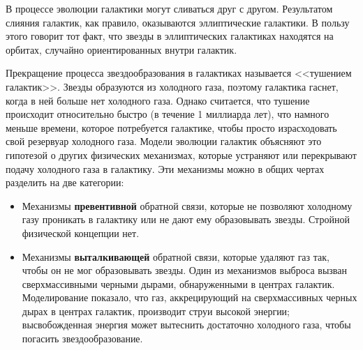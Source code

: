 В процессе эволюции галактики могут сливаться друг с другом. Результатом слияния галактик, как правило, оказываются эллиптические галактики. В пользу этого говорит тот факт, что звезды в эллиптических галактиках находятся на орбитах, случайно ориентированных внутри галактик.

Прекращение процесса звездообразования в галактиках называется <<тушением галактик>>. Звезды образуются из холодного газа, поэтому галактика гаснет, когда в ней больше нет холодного газа. Однако считается, что тушение происходит относительно быстро (в течение 1 миллиарда лет), что намного меньше времени, которое потребуется галактике, чтобы просто израсходовать свой резервуар холодного газа. Модели эволюции галактик объясняют это гипотезой о других физических механизмах, которые устраняют или перекрывают подачу холодного газа в галактику. Эти механизмы можно в общих чертах разделить на две категории:

\begin{itemize}
	\item Механизмы \textbf{превентивной} обратной связи, которые не позволяют холодному газу проникать в галактику или не дают ему образовывать звезды. Стройной физической концепции нет.
	
	\item Механизмы \textbf{выталкивающей} обратной связи, которые удаляют газ так, чтобы он не мог образовывать звезды. Один из механизмов выброса  вызван сверхмассивными черными дырами, обнаруженными в центрах галактик. Моделирование показало, что газ, аккрецирующий на сверхмассивных черных дырах в центрах галактик, производит струи высокой энергии; высвобожденная энергия может вытеснить достаточно холодного газа, чтобы погасить звездообразование.
\end{itemize}